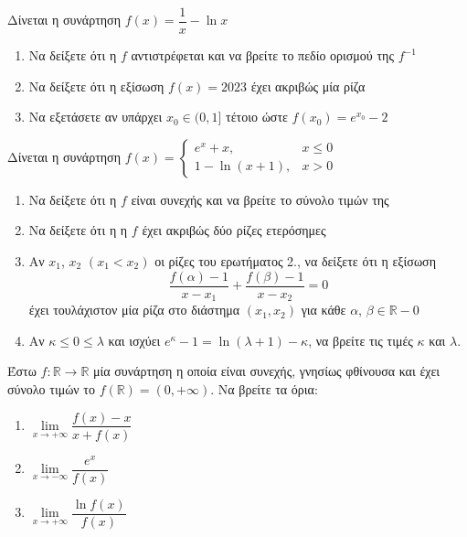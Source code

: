 \documentclass{presentation}
\begin{document}
\begin{askisi}
  Δίνεται η συνάρτηση $f(x)=\dfrac{1}{x}-\ln x$
  \begin{enumerate}
    \item<1-> Να δείξετε ότι η $f$ αντιστρέφεται και να βρείτε το πεδίο ορισμού της $f^{-1}$
    \item<2-> Να δείξετε ότι η εξίσωση $f(x)=2023$ έχει ακριβώς μία ρίζα
    \item<3-> Να εξετάσετε αν υπάρχει $x_0\in (0,1]$ τέτοιο ώστε $f(x_0)=e^{x_0}-2$
  \end{enumerate}
\end{askisi}



\begin{askisi}
  Δίνεται η συνάρτηση $f(x)=\begin{cases}
      e^x+x,       & x\le 0 \\
      1-\ln (x+1), & x>0
    \end{cases}$
  \begin{enumerate}
    \item<1-> Να δείξετε ότι η $f$ είναι συνεχής και να βρείτε το σύνολο τιμών της
    \item<2-> Να δείξετε ότι η η $f$ έχει ακριβώς δύο ρίζες ετερόσημες
    \item<3-> Αν $x_1$, $x_2$ $(x_1<x_2)$ οι ρίζες του ερωτήματος 2., να δείξετε ότι η εξίσωση
          $$\frac{f(α)-1}{x-x_1}+\frac{f(β)-1}{x-x_2}=0$$
          έχει τουλάχιστον μία ρίζα στο διάστημα $(x_1,x_2)$ για κάθε $α$, $β\in\mathbb{R}-{0}$
    \item<4-> Αν $κ\le 0\le λ$ και ισχύει $e^κ-1=\ln (λ+1)-κ$, να βρείτε τις τιμές $κ$ και $λ$.
  \end{enumerate}
\end{askisi}

\begin{askisi}
  Έστω $f:\mathbb{R}\to\mathbb{R}$ μία συνάρτηση η οποία είναι συνεχής, γνησίως φθίνουσα και έχει σύνολο τιμών το $f(\mathbb{R})=(0,+\infty)$. Να βρείτε τα όρια:
  \begin{enumerate}
    \item<1-> $\lim\limits_{x \to +\infty}{ \dfrac{f(x)-x}{x+f(x)} }$
    \item<2-> $\lim\limits_{x \to -\infty}{ \dfrac{e^x}{f(x)} }$
    \item<3-> $\lim\limits_{x \to +\infty}{ \dfrac{\ln f(x)}{f(x)} }$
  \end{enumerate}
\end{askisi}
\end{document}
